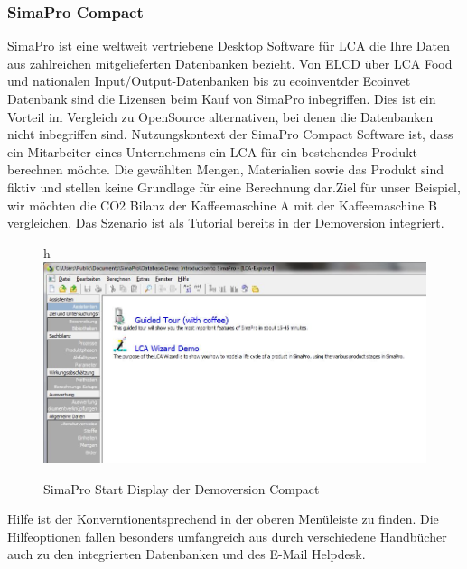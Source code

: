 \documentclass[a4paper, 12pt, twoside, BCOR=20mm, DIV=calc, abstracton, parskip=half*, toc=bibliography, toc=listof, headsepline, footsepline, headings=small, numbers=enddot]{scrreprt}
\begin{document}
\subsubsection{SimaPro Compact}
SimaPro ist eine weltweit vertriebene Desktop Software für \ac{LCA} die Ihre Daten aus zahlreichen mitgelieferten Datenbanken bezieht. Von ELCD über LCA Food und nationalen Input/Output-Datenbanken bis zu ecoinventder Ecoinvet Datenbank sind die Lizensen beim Kauf von SimaPro inbegriffen\cite{SimaPro_Homepage}. Dies ist ein Vorteil im Vergleich zu OpenSource alternativen, bei denen die Datenbanken nicht inbegriffen sind. 
Nutzungskontext der SimaPro Compact Software ist, dass ein Mitarbeiter eines Unternehmens ein \ac{LCA} für ein bestehendes Produkt berechnen möchte. Die gewählten Mengen, Materialien sowie das Produkt sind fiktiv und stellen keine Grundlage für eine Berechnung dar.Ziel für unser Beispiel, wir möchten die CO2 Bilanz der Kaffeemaschine A mit der Kaffeemaschine B vergleichen. Das Szenario ist als Tutorial bereits in der Demoversion integriert.
\begin{figure}{h}
\centering
\includegraphics[width=\textwidth]{Bild/Sima Pro Start.JPG}
\caption{SimaPro Start Display der Demoversion Compact}
\end{figure}
Hilfe ist der Konverntionentsprechend in der oberen Menüleiste zu finden. Die Hilfeoptionen fallen besonders umfangreich aus durch verschiedene Handbücher auch zu den integrierten Datenbanken und des E-Mail Helpdesk.   
\end{document}
